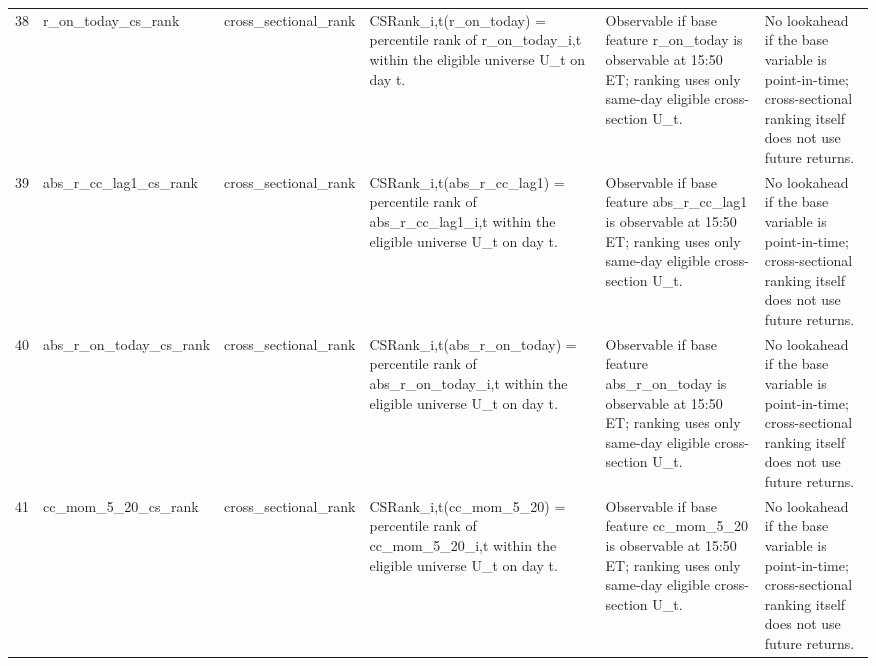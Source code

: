 \begin{landscape}
\begin{longtable}{P{0.42cm} P{2.25cm} P{2.05cm} P{5.25cm} P{4.85cm} P{5.25cm}}
38 & r\_\allowbreak{}on\_\allowbreak{}today\_\allowbreak{}cs\_\allowbreak{}rank & cross\_\allowbreak{}sectional\_\allowbreak{}rank & CSRank\_\allowbreak{}i,t(r\_\allowbreak{}on\_\allowbreak{}today) = percentile rank of r\_\allowbreak{}on\_\allowbreak{}today\_\allowbreak{}i,t within the eligible universe U\_\allowbreak{}t on day t. & Observable if base feature r\_\allowbreak{}on\_\allowbreak{}today is observable at 15:50 ET; ranking uses only same-day eligible cross-section U\_\allowbreak{}t. & No lookahead if the base variable is point-in-time; cross-sectional ranking itself does not use future returns. \\
39 & abs\_\allowbreak{}r\_\allowbreak{}cc\_\allowbreak{}lag1\_\allowbreak{}cs\_\allowbreak{}rank & cross\_\allowbreak{}sectional\_\allowbreak{}rank & CSRank\_\allowbreak{}i,t(abs\_\allowbreak{}r\_\allowbreak{}cc\_\allowbreak{}lag1) = percentile rank of abs\_\allowbreak{}r\_\allowbreak{}cc\_\allowbreak{}lag1\_\allowbreak{}i,t within the eligible universe U\_\allowbreak{}t on day t. & Observable if base feature abs\_\allowbreak{}r\_\allowbreak{}cc\_\allowbreak{}lag1 is observable at 15:50 ET; ranking uses only same-day eligible cross-section U\_\allowbreak{}t. & No lookahead if the base variable is point-in-time; cross-sectional ranking itself does not use future returns. \\
40 & abs\_\allowbreak{}r\_\allowbreak{}on\_\allowbreak{}today\_\allowbreak{}cs\_\allowbreak{}rank & cross\_\allowbreak{}sectional\_\allowbreak{}rank & CSRank\_\allowbreak{}i,t(abs\_\allowbreak{}r\_\allowbreak{}on\_\allowbreak{}today) = percentile rank of abs\_\allowbreak{}r\_\allowbreak{}on\_\allowbreak{}today\_\allowbreak{}i,t within the eligible universe U\_\allowbreak{}t on day t. & Observable if base feature abs\_\allowbreak{}r\_\allowbreak{}on\_\allowbreak{}today is observable at 15:50 ET; ranking uses only same-day eligible cross-section U\_\allowbreak{}t. & No lookahead if the base variable is point-in-time; cross-sectional ranking itself does not use future returns. \\
41 & cc\_\allowbreak{}mom\_\allowbreak{}5\_\allowbreak{}20\_\allowbreak{}cs\_\allowbreak{}rank & cross\_\allowbreak{}sectional\_\allowbreak{}rank & CSRank\_\allowbreak{}i,t(cc\_\allowbreak{}mom\_\allowbreak{}5\_\allowbreak{}20) = percentile rank of cc\_\allowbreak{}mom\_\allowbreak{}5\_\allowbreak{}20\_\allowbreak{}i,t within the eligible universe U\_\allowbreak{}t on day t. & Observable if base feature cc\_\allowbreak{}mom\_\allowbreak{}5\_\allowbreak{}20 is observable at 15:50 ET; ranking uses only same-day eligible cross-section U\_\allowbreak{}t. & No lookahead if the base variable is point-in-time; cross-sectional ranking itself does not use future returns. \\

\end{longtable}
\end{landscape}
